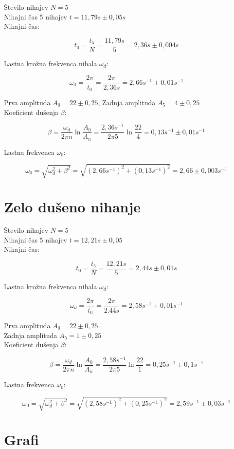 \documentclass[a4paper]{report}
\begin{document}
Število nihajev $N = 5$\\
Nihajni čas 5 nihajev $ t = 11,79s \pm 0,05s$\\
Nihajni čas:

\[
  t_0 = \frac{t_5}{N} = \frac {11,79s}{5} =2,36s \pm 0,004s
\]

Lastna krožna frekvenca nihala $\omega_d$:

\[
  \omega_d = \frac{2\pi}{t_0} = \frac{2\pi}{2,36s} = 2,66s^{-1} \pm 0,01s^{-1}
\]

Prva amplituda $A_0 = 22 \pm 0,25$, Zadnja amplituda $A_5 = 4 \pm 0,25$\\
Koeficient dušenja $\beta$:

\[
    \beta = \frac{\omega_d}{2\pi n}\ln\frac{A_0}{A_n} = \frac{2,36s^{-1}}{2 \pi 5}\ln\frac{22}{4} =0,13 s^{-1} \pm 0,01s^{-1}
\]

Lastna frekvenca $\omega_0$:

\[
    \omega_0 = \sqrt{\omega_d^2 + \beta^2} = \sqrt{(2,66s^{-1})^2 + (0,13s^{-1})^2} = 2,66\pm 0,003s^{-1}
\]

\chapter*{Zelo dušeno nihanje}

Število nihajev $N = 5$\\
Nihajni čas 5 nihajev $ t = 12,21s \pm 0,05$\\
Nihajni čas:

\[
  t_0 = \frac{t_5}{N} = \frac {12,21s}{5} = 2, 44s \pm 0,01s
\]

Lastna krožna frekvenca nihala $\omega_d$:

\[
  \omega_d = \frac{2\pi}{t_0} = \frac{2\pi}{2.44s} =2,58 s^{-1} \pm 0,01 s^{-1}
\]

Prva amplituda $A_0 = 22 \pm 0,25$\\
Zadnja amplituda $A_5 = 1 \pm 0,25$\\
Koeficient dušenja $\beta$:

\[
    \beta = \frac{\omega_d}{2\pi n}\ln\frac{A_0}{A_n} = \frac{2,58s^{-1}}{2 \pi 5}\ln\frac{22}{1} =0,25s^{-1} \pm 0,1s^{-1}
\]

Lastna frekvenca $\omega_0$:

\[
    \omega_0 = \sqrt{\omega_d^2 + \beta^2} = \sqrt{(2,58s^{-1})^2 + (0,25s^{-1})^2} = 2,59s^{-1} \pm 0,03s^{-1}
\]

\chapter*{Grafi}
\end{document}
